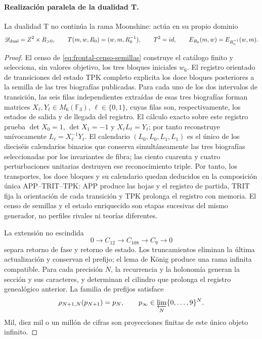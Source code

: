\paragraph{Realización paralela de la dualidad T.}
La dualidad T no continúa la rama Moonshine: actúa en su propio dominio
\begin{equation}
 \mathscr D_{\rm dual}=\mathbb Z^2\times\mathbb R_{>0},\qquad
 \mathsf T(m,w,R_0)=(w,m,R_0^{-1}),\qquad
 \mathsf T^2=\operatorname{id},\qquad
 E_{R_0}(m,w)=E_{R_0^{-1}}(w,m).
 \label{eq:frontal-dualidad-t}
\end{equation}

\begin{proof}
El censo de \eqref{eq:frontal-censo-semillas} construye el catálogo finito y
selecciona, sin valores objetivo, los tres bloques iniciales \(w_6\). El
registro orientado de transiciones del estado TPK completo explicita los doce
bloques posteriores a la semilla de las tres biografías publicadas. Para cada uno de los dos
intervalos de transición, las seis filas independientes extraídas de esas
tres biografías forman matrices
\(X_\ell,Y_\ell\in M_6(\mathbb F_3)\),
\(\ell\in\{0,1\}\), cuyas filas son, respectivamente, los estados de salida
y de llegada del registro. El cálculo exacto sobre este registro prueba
\(\det X_0=1\), \(\det X_1=-1\) y
\(X_\ell L_\ell=Y_\ell\); por tanto reconstruye unívocamente
\(L_\ell=X_\ell^{-1}Y_\ell\). El
calendario \((L_0,L_0,L_1,L_1)\) es el único de los dieciséis calendarios
binarios que conserva simultáneamente las tres biografías seleccionadas por
los invariantes de fibra; las ciento cuarenta y cuatro perturbaciones
unitarias destruyen ese reconocimiento triple. Por tanto, los transportes,
los doce bloques y su calendario quedan deducidos en la composición única
APP--TRIT--TPK: APP produce las hojas y el registro de partida, TRIT fija la
orientación de cada transición y TPK prolonga el registro con memoria. El
censo de semillas y el estado enriquecido son etapas sucesivas del mismo
generador, no perfiles rivales ni teorías diferentes.

La extensión no escindida
\[
0\longrightarrow C_{12}\longrightarrow C_{108}
\longrightarrow C_9\longrightarrow0
\]
separa retorno de fase y retorno de estado. Los truncamientos eliminan la
última actualización y conservan el prefijo; el lema de König produce una
rama infinita compatible. Para cada precisión \(N\), la recurrencia y la
holonomía generan la sección y sus caracteres, y determinan el cilindro que
prolonga el registro genealógico anterior. La familia de prefijos satisface
\[
\rho_{N+1,N}(p_{N+1})=p_N,
\qquad
p_\infty\in\varprojlim_N\{0,\ldots,9\}^{N}.
\]
Mil, diez mil o un millón de cifras son proyecciones finitas de este único
objeto infinito.


\end{proof}

